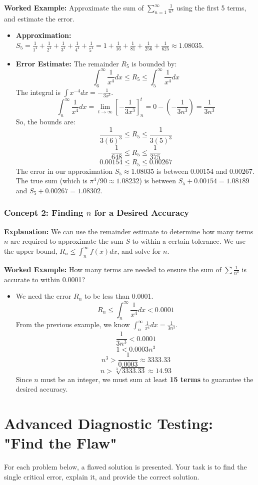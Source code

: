 \documentclass{article}
\begin{document}
\textbf{Worked Example:} Approximate the sum of $\sum_{n=1}^\infty \frac{1}{n^4}$ using the first 5 terms, and estimate the error.
\begin{itemize}
    \item \textbf{Approximation:} $S_5 = \frac{1}{1^4} + \frac{1}{2^4} + \frac{1}{3^4} + \frac{1}{4^4} + \frac{1}{5^4} = 1 + \frac{1}{16} + \frac{1}{81} + \frac{1}{256} + \frac{1}{625} \approx 1.08035$.
    \item \textbf{Error Estimate:} The remainder $R_5$ is bounded by:
    \[ \int_6^\infty \frac{1}{x^4} dx \le R_5 \le \int_5^\infty \frac{1}{x^4} dx \]
    The integral is $\int x^{-4} dx = -\frac{1}{3x^3}$.
    \[ \int_n^\infty \frac{1}{x^4} dx = \lim_{t\to\infty} [-\frac{1}{3x^3}]_n^t = 0 - (-\frac{1}{3n^3}) = \frac{1}{3n^3} \]
    So, the bounds are:
    \[ \frac{1}{3(6)^3} \le R_5 \le \frac{1}{3(5)^3} \]
    \[ \frac{1}{648} \le R_5 \le \frac{1}{375} \]
    \[ 0.00154 \le R_5 \le 0.00267 \]
    The error in our approximation $S_5 \approx 1.08035$ is between 0.00154 and 0.00267. The true sum (which is $\pi^4/90 \approx 1.08232$) is between $S_5+0.00154 = 1.08189$ and $S_5+0.00267=1.08302$.
\end{itemize}

\subsubsection{Concept 2: Finding $n$ for a Desired Accuracy}
\textbf{Explanation:} We can use the remainder estimate to determine how many terms $n$ are required to approximate the sum $S$ to within a certain tolerance. We use the upper bound, $R_n \le \int_n^\infty f(x) dx$, and solve for $n$.

\textbf{Worked Example:} How many terms are needed to ensure the sum of $\sum \frac{1}{n^4}$ is accurate to within 0.0001?
\begin{itemize}
    \item We need the error $R_n$ to be less than 0.0001.
    \[ R_n \le \int_n^\infty \frac{1}{x^4} dx < 0.0001 \]
    From the previous example, we know $\int_n^\infty \frac{1}{x^4} dx = \frac{1}{3n^3}$.
    \[ \frac{1}{3n^3} < 0.0001 \]
    \[ 1 < 0.0003 n^3 \]
    \[ n^3 > \frac{1}{0.0003} \approx 3333.33 \]
    \[ n > \sqrt[3]{3333.33} \approx 14.93 \]
    Since $n$ must be an integer, we must sum at least \textbf{15 terms} to guarantee the desired accuracy.
\end{itemize}

\section{Advanced Diagnostic Testing: "Find the Flaw"}
For each problem below, a flawed solution is presented. Your task is to find the single critical error, explain it, and provide the correct solution.
\end{document}
